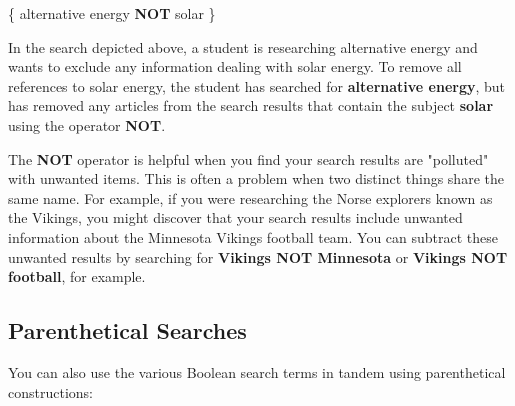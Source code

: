 \begin{center}



\{ alternative energy \textbf{NOT} solar \}

\end{center}

\noindent In the search depicted above, a student is researching alternative
energy and wants to exclude any information dealing with solar energy. To
remove all references to solar energy, the student has searched for
\textbf{alternative energy}, but has removed any articles from the search
results that contain the  subject \textbf{solar} using the operator
\textbf{NOT}.

The \textbf{NOT} operator is helpful when you find your search results are
"polluted" with unwanted items. This is often a problem when two distinct
things share the same name. For example, if you were researching the Norse
explorers known as the Vikings, you might discover that your search results
include unwanted information about the Minnesota Vikings football team. You can
subtract these unwanted results by searching for \textbf{Vikings NOT Minnesota}
or \textbf{Vikings NOT football}, for example.

\subsection{Parenthetical Searches}

You can also use the various Boolean search terms in tandem using parenthetical
constructions:

